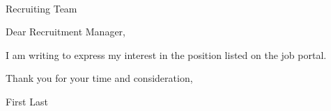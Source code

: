 \documentclass[12pt]{letter}
\begin{document}
\begin{letter}{
    \company \\
    Recruiting Team
}

\opening{Dear Recruitment Manager,}

I am writing to express my interest in the {\position} position listed on the {\company} job portal.

Thank you for your time and consideration,

First Last

\end{letter}
\end{document}
